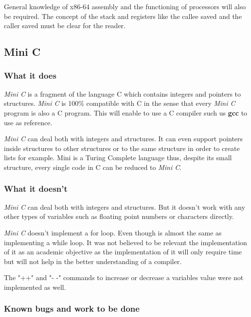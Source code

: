 \documentclass[conference]{IEEEtran}
\theoremstyle{definition}
\begin{document}
General knowledge of x86-64 assembly and the functioning of processors will also be required. The concept of the stack and registers like the callee saved and the caller saved must be clear for the reader.

\subsection{Mini C}
\subsubsection{What it does}
\textit{Mini C} is a fragment of the language C which contains integers and pointers to structures. \textit{Mini C} is 100\% compatible with C in the sense that every \textit{Mini C} program is also a C program. This will enable to use a C compiler such us \textbf{gcc} to use as reference.

\textit{Mini C} can deal both with integers and structures. It can even support pointers inside structures to other structures or to the same structure in order to create lists for example. Mini is a Turing Complete language thus, despite its small structure, every single code in C can be reduced to \textit{Mini C}.

\subsubsection{What it doesn't}
\textit{Mini C} can deal both with integers and structures. But it doesn't work with any other types of variables such as floating point numbers or characters directly.


\textit{Mini C} doesn't implement a for loop. Even though is almost the same as implementing a while loop. It was not believed to be relevant the implementation of it as an academic objective as the implementation of it will only require time but will not help in the better understanding of a compiler.
 
The "++" and "- -" commands to increase or decrease a variables value were not implemented as well.

\subsubsection{Known bugs and work to be done}
\end{document}
